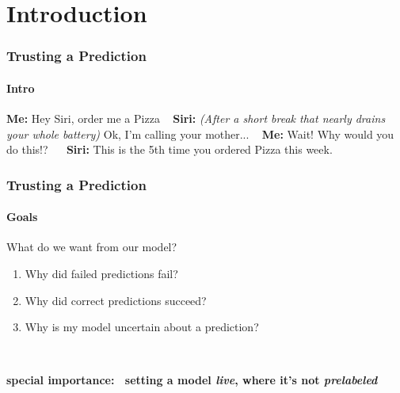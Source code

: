 \section[Intro]{Introduction}

\begin{frame}
	\frametitle{Trusting a Prediction}
	\framesubtitle{Intro}
	\begin{LARGE}
		\textbf{Me:} Hey Siri, order me a Pizza \newline  ~\newline
		\textbf{Siri:} \textit{(After a short break that nearly drains your whole battery)} Ok, I'm calling your mother... \newline  ~\newline
		\textbf{Me:} Wait! Why would you do this!? ~\newline ~\newline
		\textbf{Siri:} This is the 5th time you ordered Pizza this week. \newline ~\newline
	\end{LARGE} 
\end{frame}

\begin{frame}
	\frametitle{Trusting a Prediction}
	\framesubtitle{Goals}
	\begin{Large}
		What do we want from our model? ~\newline
		
		\begin{enumerate}
			\item Why did failed predictions fail?
			\item Why did correct predictions succeed?
			\item Why is my model uncertain about a prediction?
		\end{enumerate} ~\newline~\newline
	
	\textbf{special importance: ~\newline setting a model \textit{live}, where it's not \textit{prelabeled}}
	\end{Large}
\end{frame}

